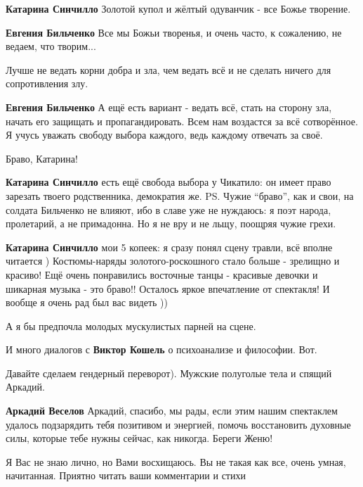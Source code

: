 \begin{itemize}
\begin{itemize}
\textbf{Катарина Синчилло} Золотой купол и жёлтый одуванчик - все Божье творение.

\textbf{Евгения Бильченко} Все мы Божьи творенья, и очень часто, к сожалению, не ведаем, что творим...

Лучше не ведать корни добра и зла, чем ведать всё и не сделать ничего для сопротивления злу.


\textbf{Евгения Бильченко} А ещё есть вариант - ведать всё, стать на сторону
зла, начать его защищать и пропагандировать. Всем нам воздастся за всё
сотворённое. Я учусь уважать свободу выбора каждого, ведь каждому отвечать за
своё.


Браво, Катарина!


\textbf{Катарина Синчилло} есть ещё свобода выбора у Чикатило: он имеет право
зарезать твоего родственника, демократия же. PS. Чужие \enquote{браво}, как и свои, на
солдата Бильченко не влияют, ибо в славе уже не нуждаюсь: я поэт народа,
пролетарий, а не примадонна. Но я не вру и не льщу, поощряя чужие грехи.


\textbf{Катарина Синчилло} мои 5 копеек: я сразу понял сцену травли, всё вполне читается
) Костюмы-наряды золотого-роскошного стало больше - зрелищно и красиво! Ещё
очень понравились восточные танцы - красивые девочки и шикарная музыка - это
браво!! Осталось яркое впечатление от спектакля! И вообще я очень рад был вас
видеть ))


А я бы предпочла молодых мускулистых парней на сцене.

И много диалогов с \textbf{Виктор Кошель} о психоанализе и философии. Вот.


Давайте сделаем гендерный переворот). Мужские полуголые тела и спящий Аркадий.


\textbf{Аркадий Веселов} Аркадий, спасибо, мы рады, если этим нашим спектаклем
удалось подзарядить тебя позитивом и энергией, помочь восстановить духовные
силы, которые тебе нужны сейчас, как никогда. Береги Женю!

\end{itemize}


Я Вас не знаю лично, но Вами восхищаюсь. Вы не такая как все, очень умная,
начитанная. Приятно читать ваши комментарии и стихи

\end{itemize}

